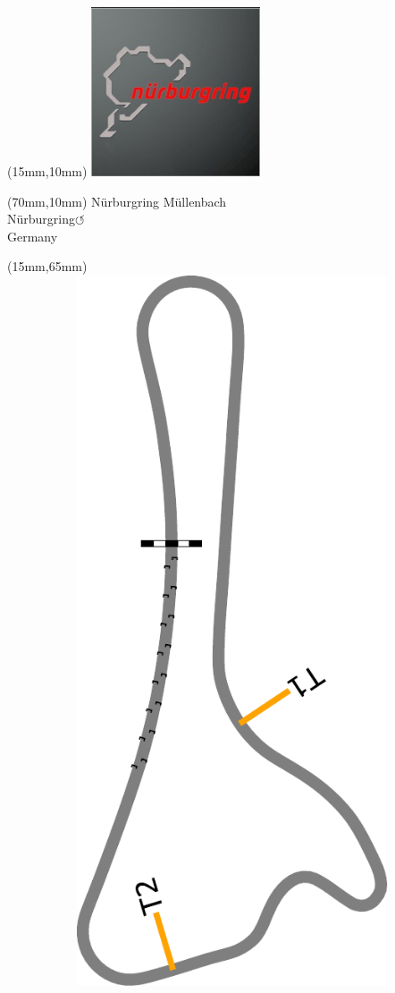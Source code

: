 \null\newpage
\begin{textblock*}{50mm}(15mm,10mm)%
\includegraphics[width=50mm]{LG/2015-05-20_00089.png}
\end{textblock*}
\begin{textblock*}{130mm}(70mm,10mm)%
{\fontsize{20}{20}\selectfont Nürburgring Müllenbach\\}
{\fontsize{16}{16}\selectfont Nürburgring\hfill \huge$\circlearrowleft$\\}
{\fontsize{12}{12}\selectfont Germany\\}
\end{textblock*}
\begin{textblock*}{185mm}(15mm,65mm)%
\centering
\mbox{\includegraphics[width=185mm,height=210mm,keepaspectratio]{PT/NBRMB.pdf}}
\end{textblock*}

